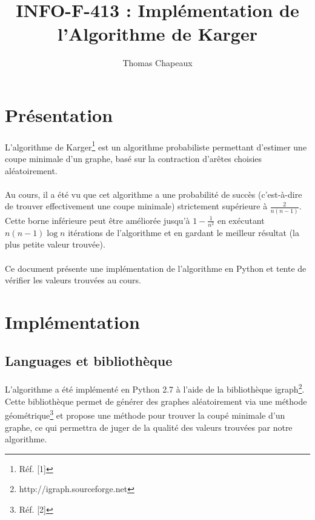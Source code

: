\documentclass[a4paper,10pt]{article}
\title{INFO-F-413 : Implémentation de l'Algorithme de Karger}
\author{Thomas Chapeaux}
\begin{document}
\maketitle

\section{Présentation}

\paragraph{}
L'algorithme de 
Karger\footnote{Réf. [1]}
est un algorithme probabiliste permettant d'estimer une coupe minimale d'un graphe,
basé sur la contraction d'arêtes choisies aléatoirement.

\paragraph{}
Au cours, il a été vu que cet algorithme a une probabilité de succès (c'est-à-dire de trouver effectivement une coupe minimale) strictement supérieure à
\begin{math} \frac{2}{n(n-1)} \end{math}.
Cette borne inférieure peut être améliorée jusqu'à
\begin{math} 1- \frac{1}{n^{2}} \end{math} en exécutant
\begin{math} n(n-1)\log{n} \end{math} itérations de l'algorithme et en gardant le meilleur résultat (la plus petite valeur trouvée).

\paragraph{}
Ce document présente une implémentation de l'algorithme en Python et tente de vérifier les valeurs trouvées au cours.

\section{Implémentation}

\subsection{Languages et bibliothèque}
\paragraph{}
L'algorithme a été implémenté en Python 2.7 à l'aide de la bibliothèque
igraph\footnote{http://igraph.sourceforge.net}.
Cette bibliothèque permet de générer des graphes aléatoirement via une méthode
géométrique\footnote{Réf. [2]}
et propose une méthode pour trouver la coupé minimale d'un graphe, ce qui permettra de juger de la qualité des valeurs trouvées par notre algorithme.
\end{document}
